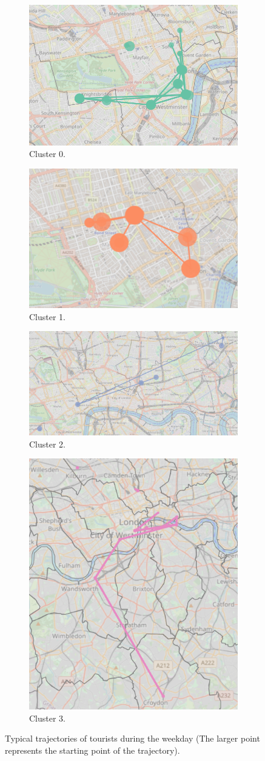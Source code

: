 \documentclass{article}
\theoremstyle{definition}
\theoremstyle{remark}
\begin{document}
\begin{figure}[!h]

\centering
\begin{subfigure}{0.6\textheight}
\centering
\includegraphics[width=0.4\linewidth]{figures/weekday_tourists_c0.png}
\caption{Cluster 0.}
\label{fig:weekday_tourists_c0}
\end{subfigure}
\begin{subfigure}{0.6\textheight}
\centering
\includegraphics[width=0.4\linewidth]{figures/weekday_tourists_c1.png}
\caption{Cluster 1.}
\label{fig:weekday_tourists_c1}
\end{subfigure}
\begin{subfigure}{0.6\textheight}
\centering
\includegraphics[width=0.4\linewidth]{figures/weekday_tourists_c2.png}
\caption{Cluster 2.}
\label{fig:weekday_tourists_c2}
\end{subfigure}
\begin{subfigure}{0.6\textheight}
\centering
\includegraphics[width=0.4\linewidth]{figures/weekday_tourists_c3.png}
\caption{Cluster 3.}
\label{fig:weekday_tourists_c3}
\end{subfigure}

\caption{Typical trajectories of tourists during the weekday (The larger point represents the starting point of the trajectory).}
\label{fig:sequences_weekday_tourists}
\end{figure}
\end{document}
